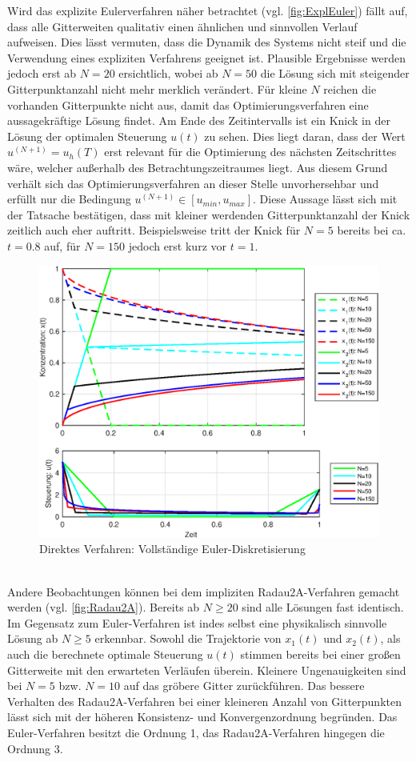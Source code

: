 Wird das explizite Eulerverfahren näher betrachtet (vgl. \autoref{fig:ExplEuler}) fällt auf, dass alle Gitterweiten qualitativ einen ähnlichen und sinnvollen Verlauf aufweisen. Dies lässt vermuten, dass die Dynamik des Systems nicht steif und die Verwendung eines expliziten Verfahrens geeignet ist. Plausible Ergebnisse werden jedoch erst ab $N=20$ ersichtlich, wobei ab $N=50$  die Lösung sich mit steigender Gitterpunktanzahl nicht mehr merklich verändert. Für kleine $N$ reichen die vorhanden Gitterpunkte nicht aus, damit das Optimierungsverfahren eine aussagekräftige Lösung findet. Am Ende des Zeitintervalls ist ein Knick in der Lösung der optimalen Steuerung $u(t)$ zu sehen. Dies liegt daran, dass der Wert $u^{(N+1)}= u_h(T)$ erst relevant für die Optimierung des nächsten Zeitschrittes wäre, welcher außerhalb des Betrachtungszeitraumes liegt. Aus diesem Grund verhält sich das Optimierungsverfahren an dieser Stelle unvorhersehbar und erfüllt nur die Bedingung $u^{(N+1)} \in [u_{min},u_{max}]$. Diese Aussage lässt sich mit der Tatsache bestätigen, dass mit kleiner werdenden Gitterpunktanzahl der Knick zeitlich auch eher auftritt. Beispielsweise tritt der Knick für $N=5$ bereits bei ca. $t=0.8$ auf, für $N=150$ jedoch erst kurz vor $t=1$.
\begin{figure}[h!]
	\centering
	\includegraphics[width=.98\textwidth]{images/Expl_Result}
	\caption{Direktes Verfahren: Vollständige Euler-Diskretisierung}
	\label{fig:ExplEuler}
\end{figure}
\\Andere Beobachtungen können bei dem impliziten Radau2A-Verfahren gemacht werden (vgl. \autoref{fig:Radau2A}). Bereits ab $N \geq 20$ sind alle Lösungen fast identisch. Im Gegensatz zum Euler-Verfahren ist indes selbst eine physikalisch sinnvolle Lösung ab $N \geq 5$ erkennbar. Sowohl die Trajektorie von $x_1(t)$ und $x_2(t)$, als auch die berechnete optimale Steuerung $u(t)$ stimmen bereits bei einer großen Gitterweite mit den erwarteten Verläufen überein. Kleinere Ungenauigkeiten sind bei $N=5$ bzw. $N=10$ auf das gröbere Gitter zurückführen. Das bessere Verhalten des Radau2A-Verfahren bei einer kleineren Anzahl von Gitterpunkten lässt sich mit der höheren Konsistenz- und Konvergenzordnung begründen. Das Euler-Verfahren besitzt die Ordnung 1, das Radau2A-Verfahren hingegen die Ordnung 3.
